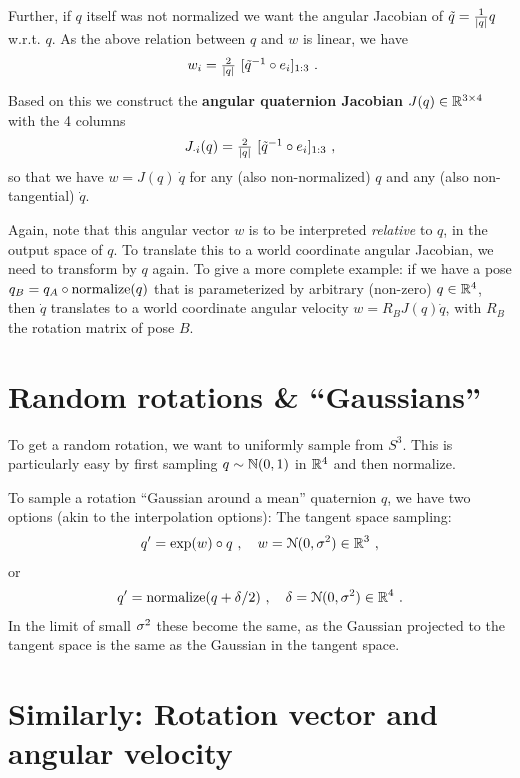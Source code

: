 Further, if $q$ itself was not normalized we want the angular Jacobian
of $\tilde q = \textstyle\frac1{|q|} q$ w.r.t. $q$. As the above relation between $q$
and $w$ is linear, we have
\begin{align}
w_i
&= \textstyle\frac2{|q|}~ [\tilde q^{-1} \circ e_i]_{1:3} ~.
\end{align}

Based on this we construct the \textbf{angular quaternion Jacobian}
$J(q) \in {\mathbb{R}}^{3\times 4}$ with the 4 columns
\begin{align}
J_{\cdot i}(q) = \textstyle\frac2{|q|}~ [\tilde q^{-1} \circ e_i]_{1:3} ~,
\end{align}
so that we have $w = J(q)~ \dot q$ for any (also non-normalized) $q$
and any (also  non-tangential) $\dot q$.

Again, note that this angular vector $w$ is to be
interpreted \emph{relative} to $q$, in the output space of $q$. To
translate this to a world coordinate angular Jacobian, we need to
transform by $q$ again. To give a more complete example: if we have a
pose $q_B = q_A \circ \text{normalize}(q)$ that is parameterized by arbitrary (non-zero)
$q\in{\mathbb{R}}^4$, then $\dot
q$ translates to a world coordinate angular velocity $w = R_B 
J(q) \dot q$, with $R_B$ the rotation matrix of pose $B$.


\section{Random rotations \& ``Gaussians''}

To get a random rotation, we want to uniformly sample from $S^3$. This
is particularly easy by first sampling $q\sim{\mathbb{N}}(0,1)$ in ${\mathbb{R}}^4$
and then normalize.

To sample a rotation ``Gaussian around a mean'' quaternion $q$, we
have two options (akin to the interpolation options): The tangent
space sampling:
\begin{align}
q' = \exp(w) \circ q~,\quad w = {\cal N}(0,\sigma^2) \in {\mathbb{R}}^3 ~,
\end{align}
or
\begin{align}
q' = \text{normalize}(q + \delta/2)~,\quad \delta = {\cal N}(0,\sigma^2) \in {\mathbb{R}}^4 ~.
\end{align}
In the limit of small $\sigma^2$ these become the same, as the Gaussian
projected to the tangent space is the same as the Gaussian in the
tangent space.

\appendix
\section{Similarly: Rotation vector and angular velocity}

